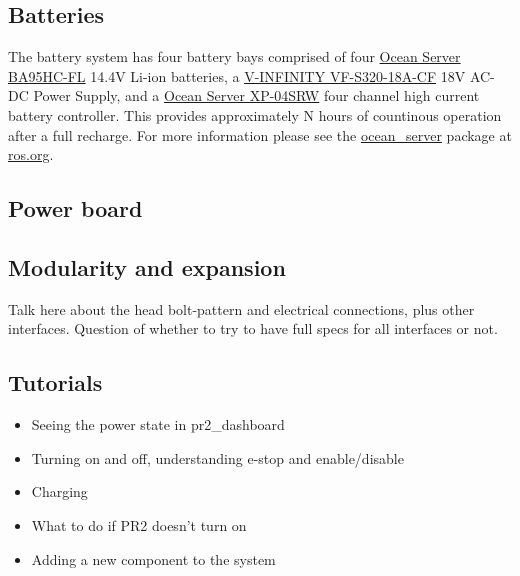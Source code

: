 \begin{description}
\subsection{Batteries}
The battery system has four battery bays comprised of four \href{http://www.oceanserver-store.com/18.html}{Ocean Server BA95HC-FL}
14.4V Li-ion batteries, a \href{http://www.v-infinity.com/adtemplate_child.asp?c=710918&p=903285&catky=764537&subcatky1=46887&subcatky2=320934}{V-INFINITY VF-S320-18A-CF}
18V AC-DC Power Supply, and a \href{http://www.oceanserver-store.com/xpmibamamo.html}{Ocean Server XP-04SRW} four channel high current battery controller. 
This provides approximately N hours of countinous operation after a full recharge. For more information please see the 
\href{http://www.ros.org/wiki/ocean\_server}{ocean\_server} package at \href{http://www.ros.org}{ros.org}.
\end{description}

\subsection{Power board}
\subsection{Modularity and expansion}
Talk here about the head bolt-pattern and electrical connections, plus other interfaces.  Question of whether to try to have full specs for all interfaces or not.
\subsection{Tutorials} 
\begin{itemize}
\item{Seeing the power state in pr2\_dashboard}
\item{Turning on and off, understanding e-stop and enable/disable}
\item{Charging}
\item{What to do if PR2 doesn't turn on}
\item{Adding a new component to the system}
\end{itemize}


